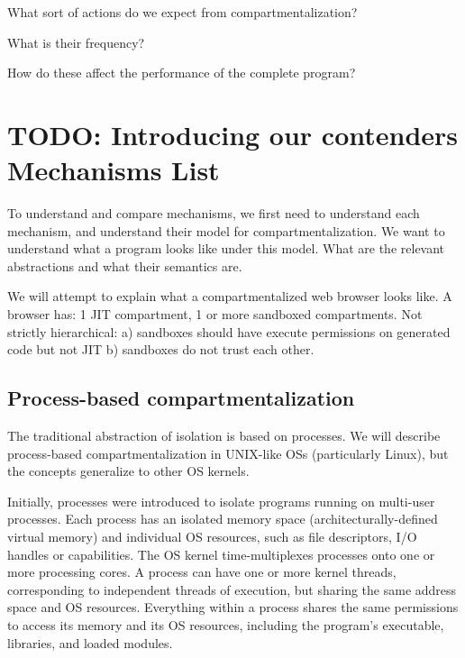 What sort of actions do we expect from compartmentalization?

What is their frequency?

How do these affect the performance of the complete program?

\section{TODO: Introducing our contenders \\ Mechanisms List}

To understand and compare mechanisms, we first need to understand each 
mechanism, and understand their model for compartmentalization.
We want to understand what a program looks like under this model.
What are the relevant abstractions and what their semantics are.

We will attempt to explain what a compartmentalized web browser looks like.
A browser has: 1 JIT compartment, 1 or more sandboxed compartments.
Not strictly hierarchical:
a) sandboxes should have execute permissions on generated code but not JIT
b) sandboxes do not trust each other.

\subsection{Process-based compartmentalization}

The traditional abstraction of isolation is based on processes.
We will describe process-based compartmentalization in UNIX-like OSs
(particularly Linux), 
but the concepts generalize to other OS kernels.

Initially, processes were introduced to isolate programs running on multi-user
processes.
Each process has an isolated memory space (architecturally-defined virtual memory)
and individual OS resources, such as file descriptors, I/O handles or capabilities.
The OS kernel time-multiplexes processes onto one or more processing cores.
A process can have one or more kernel threads, corresponding to independent threads
of execution, but sharing the same address space and OS resources.
Everything within a process shares the same permissions to access its memory and
its OS resources, including the program's executable, libraries, and loaded modules.

